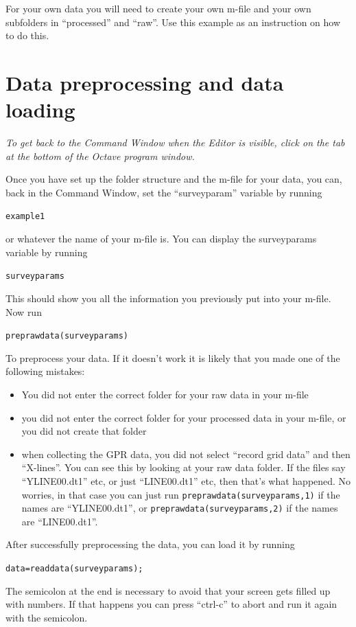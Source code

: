 \documentclass[11pt]{article}
\begin{document}
For your own data you will need to create your own m-file and your own
subfolders in ``processed'' and ``raw''. Use this example as an
instruction on how to do this.

\section{Data preprocessing and data loading}
\emph{To get back to the Command Window when the Editor is visible,
  click on the tab at the bottom of the Octave program window.}

Once you have set up the folder structure and the m-file for your
data, you can, back in the Command Window, set the ``surveyparam''
variable by running

\qquad \verb#example1#

or whatever the name of your m-file is. You can display the
surveyparams variable by running

\qquad \verb#surveyparams#

This should show you all the information you previously put into your
m-file.  Now run

\qquad \verb#preprawdata(surveyparams)#

To preprocess your data. If it doesn't work it is likely that you made
one of the following mistakes:
\begin{itemize}
\item You did not enter the correct folder for your raw data in your
  m-file
\item you did not enter the correct folder for your processed data in
  your m-file, or you did not create that folder
\item when collecting the GPR data, you did not select ``record grid
  data'' and then ``X-lines''. You can see this by looking at your raw
  data folder. If the files say ``YLINE00.dt1'' etc, or just
  ``LINE00.dt1'' etc, then that's what happened. No worries, in that
  case you can just run \qquad \verb#preprawdata(surveyparams,1)# if
  the names are ``YLINE00.dt1'', or \verb#preprawdata(surveyparams,2)#
  if the names are ``LINE00.dt1''.
\end{itemize}

After successfully preprocessing the data, you can load it by running

\qquad \verb#data=readdata(surveyparams);#

The semicolon at the end is necessary to avoid that your screen gets
filled up with numbers. If that happens you can press ``ctrl-c'' to
abort and run it again with the semicolon.
 
\end{document}
